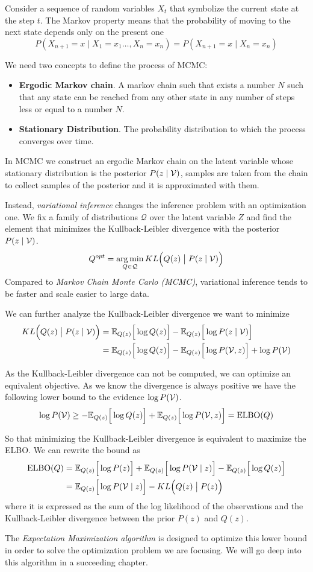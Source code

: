 Consider a sequence of random variables \(X_{t}\) that symbolize the current state at the step \(t\). The Markov property means that the probability of moving to the next state depends only on the present one
\[
  P(X_{n+1} = x \mid X_{1} = x_{1} \dots, X_{n} = x_{n}) = P(X_{n+1} = x \mid X_{n} = x_{n})
\]

We need two concepts to define the process of MCMC:
\begin{itemize}
  \item \textbf{Ergodic Markov chain}. A markov chain such that exists a number \(N\) such that any state can be reached from any other state in any number of steps less or equal to a number \(N\).
  \item \textbf{Stationary Distribution}. The probability distribution to which the process converges over time.
\end{itemize}

In MCMC we construct an ergodic Markov chain on the latent variable whose stationary distribution is the posterior \(P(z \mid \mathcal{V})\), samples are taken from the chain to collect samples of the posterior and it is approximated with them.

Instead, \emph{variational inference} changes the inference problem with an optimization one. We fix a family of distributions \(\mathcal{Q}\) over the latent variable \(Z\) and find the element that minimizes the Kullback-Leibler divergence with the posterior \(P(z \mid \mathcal{V})\).
\[
  Q^{opt} = \operatorname*{arg\,min}_{Q \in \mathcal{Q}} KL\Big(Q(z) \bigm| P(z \mid \mathcal{V})\Big)
\]
Compared to \emph{Markov Chain Monte Carlo (MCMC)}, variational inference tends to be faster and scale easier to large data.

We can further analyze the Kullback-Leibler divergence we want to minimize
\[
  \begin{aligned}
    KL\Big(Q(z) \bigm| P(z \mid \mathcal{V})\Big) &= \mathbb{E}_{Q(z)}\Big[\log{Q(z)}\Big] - \mathbb{E}_{Q(z)}\Big[\log{P(z \mid \mathcal{V})}\Big]\\
    &= \mathbb{E}_{Q(z)}\Big[\log{Q(z)}\Big] - \mathbb{E}_{Q(z)}\Big[\log{P(\mathcal{V}, z)}\Big] + \log{P(\mathcal{V})}
  \end{aligned}
\]

As the Kullback-Leibler divergence can not be computed, we can optimize an equivalent objective. As we know the divergence is always positive we have the following lower bound to the evidence \(\log{P(\mathcal{V})}\).
\[
  \log{P(\mathcal{V})} \geq  - \mathbb{E}_{Q(z)}\Big[\log{Q(z)}\Big] + \mathbb{E}_{Q(z)}\Big[\log{P(\mathcal{V}, z)}\Big]  = \text{ELBO}(Q)
\]

So that minimizing the Kullback-Leibler divergence is equivalent to maximize the ELBO. We can rewrite the bound as
\[
  \begin{aligned}
    \text{ELBO}(Q) &= \mathbb{E}_{Q(z)}\Big[\log{P(z)}\Big] + \mathbb{E}_{Q(z)}\Big[\log{P(\mathcal{V}\mid z)}\Big] - \mathbb{E}_{Q(z)}\Big[\log{Q(z)}\Big]\\
    &= \mathbb{E}_{Q(z)}\Big[\log{P(\mathcal{V}\mid z)}\Big] - KL\Big(Q(z) \bigm| P(z)\Big)
  \end{aligned}
\]
where it is expressed as the sum of the log likelihood of the observations and the Kullback-Leibler divergence between the prior \(P(z)\) and \(Q(z)\).

The \emph{Expectation Maximization algorithm} is designed to optimize this lower bound in order to solve the optimization problem we are focusing. We will go deep into this algorithm in a succeeding chapter.
